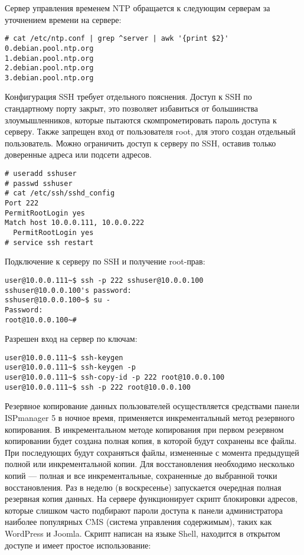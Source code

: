 Сервер управления временем NTP обращается к следующим серверам за уточнением времени на сервере:
\begin{lstlisting}
# cat /etc/ntp.conf | grep ^server | awk '{print $2}'
0.debian.pool.ntp.org
1.debian.pool.ntp.org
2.debian.pool.ntp.org
3.debian.pool.ntp.org
\end{lstlisting}
Конфигурация SSH требует отдельного пояснения.
Доступ к SSH по стандартному порту закрыт, это позволяет избавиться от большинства злоумышленников, которые пытаются скомпрометировать пароль доступа к серверу.
Также запрещен вход от пользователя root, для этого создан отдельный пользователь.
Можно ограничить доступ к серверу по SSH, оставив только доверенные адреса или подсети адресов.
\begin{lstlisting}
# useradd sshuser
# passwd sshuser
# cat /etc/ssh/sshd_config
Port 222
PermitRootLogin yes
Match host 10.0.0.111, 10.0.0.222
  PermitRootLogin yes
# service ssh restart
\end{lstlisting}
Подключение к серверу по SSH и получение root-прав:
\begin{lstlisting}
user@10.0.0.111~$ ssh -p 222 sshuser@10.0.0.100
sshuser@10.0.0.100's password:
sshuser@10.0.0.100~$ su -
Password:
root@10.0.0.100~#
\end{lstlisting}
Разрешен вход на сервер по ключам:
\begin{lstlisting}
user@10.0.0.111~$ ssh-keygen
user@10.0.0.111~$ ssh-keygen -p
user@10.0.0.111~$ ssh-copy-id -p 222 root@10.0.0.100
user@10.0.0.111~$ ssh -p 222 root@10.0.0.100
\end{lstlisting}
Резервное копирование данных пользователей осуществляется средствами панели ISPmanager 5 в ночное время, применяется инкрементальный метод резервного копирования.
В инкрементальном методе копирования при первом резервном копировании будет создана полная копия, в которой будут сохранены все файлы.
При последующих будут сохраняться файлы, измененные с момента предыдущей полной или инкрементальной копии.
Для восстановления необходимо несколько копий --- полная и все инкрементальные, сохраненные до выбранной точки восстановления.
Раз в неделю (в воскресенье) запускается очередная полная резервная копия данных.
На сервере функционирует скрипт блокировки адресов, которые слишком часто подбирают пароли доступа к панели администратора наиболее популярных CMS (система управления содержимым), таких как WordPress и Joomla.
Скрипт написан на языке Shell, находится в открытом доступе и имеет простое использование:
